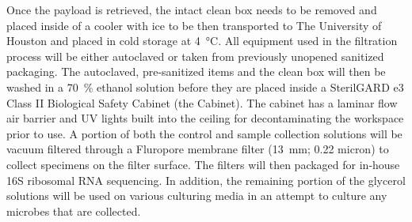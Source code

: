 Once the payload is retrieved, the intact clean box needs to be removed and placed inside of a cooler with ice to be then transported to The University of Houston and placed in cold storage at \SI{4}{\celsius}. All equipment used in the filtration process will be either autoclaved or taken from previously unopened sanitized packaging. The autoclaved, pre-sanitized items and the clean box will then be washed in a \SI{70}{\percent} ethanol solution before they are placed inside a SterilGARD e3 Class II Biological Safety Cabinet (the Cabinet). The cabinet has a laminar flow air barrier and UV lights built into the ceiling for decontaminating the workspace prior to use. A portion of both the control and sample collection solutions will be vacuum filtered through a Fluropore membrane filter (\SI{13}{\milli\meter}; \num{0.22} micron) to collect specimens on the filter surface.  The filters will then packaged for in-house 16S ribosomal RNA sequencing.  In addition, the remaining portion of the glycerol solutions will be used on various culturing media in an attempt to culture any microbes that are collected.
